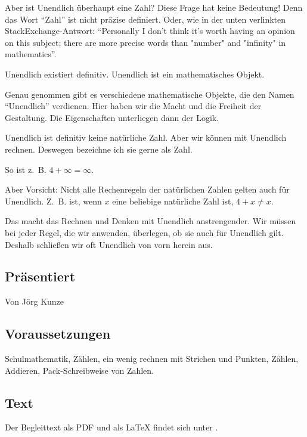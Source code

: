 \documentclass[a4paper]{amsart}
\theoremstyle{definition}
\begin{document}
Aber ist Unendlich überhaupt eine Zahl? Diese Frage hat keine Bedeutung! Denn das Wort "`Zahl"' ist nicht präzise definiert. Oder, wie in der unten verlinkten StackExchange-Antwort: "`Personally I don't think it's worth having an opinion on this subject; there are more precise words than "number" and "infinity" in mathematics"'.

Unendlich existiert definitiv. Unendlich ist ein mathematisches Objekt.

Genau genommen  gibt es verschiedene mathematische Objekte, die den Namen "`Unendlich"' verdienen. Hier haben wir die Macht und die Freiheit der Gestaltung. Die Eigenschaften unterliegen dann der Logik.

Unendlich ist definitiv keine natürliche Zahl. Aber wir können mit Unendlich rechnen. Deswegen bezeichne ich sie gerne als Zahl.

So ist z.~B. $4 + \infty = \infty$.

Aber Vorsicht: Nicht alle Rechenregeln der natürlichen Zahlen gelten auch für Unendlich. Z.~B. ist, wenn $x$ eine beliebige natürliche Zahl ist, $4 +x  \ne x$.

Das macht das Rechnen und Denken mit Unendlich anstrengender. Wir müssen bei jeder Regel, die wir anwenden, überlegen, ob sie auch für Unendlich gilt. Deshalb schließen wir oft Unendlich von vorn herein aus.

\subsection*{Präsentiert}
Von Jörg Kunze

\subsection*{Voraussetzungen}
Schulmathematik, Zählen, ein wenig rechnen mit Strichen und Punkten, Zählen, Addieren, Pack-Schreibweise von Zahlen.

\subsection*{Text}
Der Begleittext als PDF und als LaTeX findet sich unter
\url{}.
\end{document}
